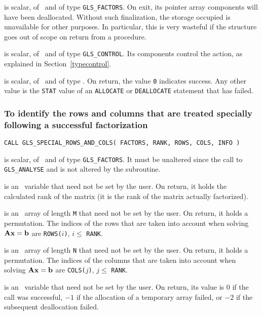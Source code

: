 \documentclass{galahad}
\newcommand{\packagename}{GLS}
\begin{document}
\vspace*{-1mm}
\begin{description}

 is scalar, of \intentinout\ and of type
{\tt \packagename\_FACTORS}. On exit, its pointer array components will have
been deallocated.  Without such finalization, the storage occupied is 
unavailable for other purposes. In particular, this is very wasteful 
if the structure goes out of scope on return from a procedure.

 is scalar, of \intentin\ and of type {\tt \packagename\_CONTROL}. 
Its components control the action, as explained in
Section~\ref{typecontrol}.

 is scalar, of \intentout\ and of type \integer.  On return,
the value {\tt 0} indicates success. Any other value is the {\tt STAT} value of
an {\tt ALLOCATE} or {\tt DEALLOCATE} statement that has failed.

\end{description}


\subsubsection{ To identify the rows and columns that are treated specially
         following a successful factorization}

\hspace{8mm}
{\tt CALL \packagename\_SPECIAL\_ROWS\_AND\_COLS( FACTORS, RANK, ROWS, COLS, 
INFO )}

\begin{description}

 is scalar, of \intentin\ and of type {\tt \packagename\_FACTORS}. 
It must be unaltered since the call to {\tt \packagename\_ANALYSE} and is 
not altered by the subroutine.

 is an \integer\ variable that need not be set by the user. On
return, it holds the calculated rank of the matrix (it is the rank of the
matrix actually factorized).

 is an \integer\ array of length {\tt M} that need not be set by the
user. On return, it holds a permutation. The indices of the rows that
are taken into account when solving ${\mathbf{A}} {\mathbf{x}} = {\mathbf{b}}$
are {\tt ROWS(}$i${\tt )}, $i \leq$ {\tt RANK}.

 is an \integer\ array of length {\tt N} that need not be set by the
user. On return, it holds a permutation. The indices of the columns that
are taken into account when solving ${\mathbf{A}} {\mathbf{x}} = {\mathbf{b}}$
are {\tt COLS(}$j${\tt )}, $j \leq$ {\tt RANK}.

 is an \integer\ variable that need not be set by the user. On
return, its value is $0$ if the call was successful, $-1$ if the allocation
of a temporary array failed, or $-2$ if the subsequent deallocation
failed.

\end{description}
\end{document}
